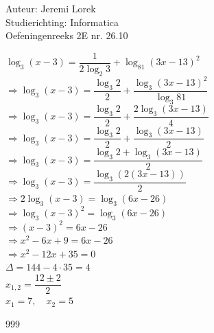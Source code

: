 \documentclass[a4paper]{article}
\begin{document}
\newcommand{\sech}{\operatorname{sech}}

\noindent \large Auteur: Jeremi Lorek\\
\noindent \large Studierichting: Informatica\\
\noindent \large Oefeningenreeks 2E nr. 26.10\\

\medskip
\normalsize

$\log_3 (x-3) = \dfrac{1}{2 \log_2 3} + \log_{81} (3x-13)^2$  \\

$\Rightarrow \log_3 (x-3) = \dfrac{\log_3 2}{2} + \dfrac{\log_3 (3x-13)^2}{\log_3 81}$  \\

$\Rightarrow \log_3 (x-3) = \dfrac{\log_3 2}{2} + \dfrac{2 \log_3 (3x-13)}{4}$  \\

$\Rightarrow \log_3 (x-3) = \dfrac{\log_3 2}{2} + \dfrac{\log_3 (3x-13)}{2}$  \\

$\Rightarrow \log_3 (x-3) = \dfrac{\log_3 2 + \log_3 (3x-13)}{2}$  \\

$\Rightarrow \log_3 (x-3) = \dfrac{\log_3 \left( 2(3x-13) \right)}{2}$  \\

$\Rightarrow 2 \log_3 (x-3) = \log_3 (6x-26)$  \\

$\Rightarrow \log_3 (x-3)^2 = \log_3 (6x-26)$  \\

$\Rightarrow (x-3)^2 = 6x - 26$  \\

$\Rightarrow x^2 - 6x + 9 = 6x - 26$  \\

$\Rightarrow x^2 - 12x + 35 = 0$  \\

$\Delta = 144 - 4 \cdot 35 = 4$  \\

$x_{1,2} = \dfrac{12 \pm 2}{2}$  \\

$x_1 = 7, \quad x_2 = 5$  \\





\begin{thebibliography}{999}
\end{thebibliography}
\end{document}
